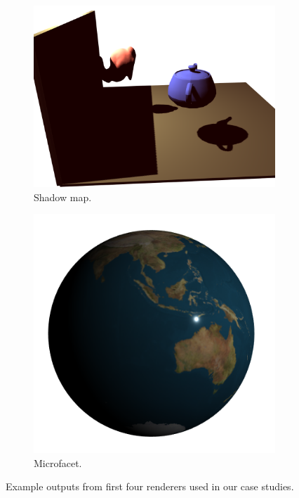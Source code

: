 \documentclass[acmsmall,review,anonymous]{acmart}
\begin{document}
\begin{figure}
	\begin{subfigure}[b]{0.45\linewidth}
		\centering
		\includegraphics[width=\linewidth]{fig/shadowmap.png}
		\caption{Shadow map.}
	\end{subfigure}
	\hfill
	\begin{subfigure}[b]{0.45\linewidth}
		\centering
		\includegraphics[width=\linewidth]{fig/microfacet.png}
		\caption{Microfacet.}
	\end{subfigure}
	\caption{Example outputs from first four renderers used in our case studies.}
\end{figure}
\end{document}
